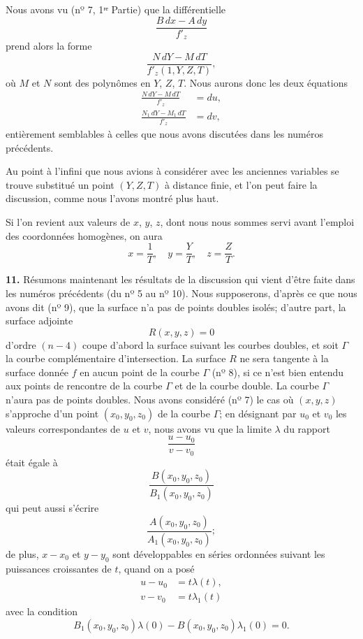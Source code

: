 \documentclass{article}
\begin{document}
Nous avons vu (nº 7, 1ʳᵉ Partie) que la différentielle
\[
\frac{B\,dx - A\,dy}{f'_{z}}
\]
prend alors la forme
\[
\frac{N\,dY - M\,dT}{f'_{z}(1, Y, Z, T)},
\]
où $M$ et $N$ sont des polynômes en $Y$, $Z$, $T$. Nous aurons donc les deux équations
\[
\begin{aligned}
\frac{N\,dY - M\,dT}{f'_{z}} &= du, \\
\frac{N_{1}\,dY - M_{1}\,dT}{f'_{z}} &= dv,
\end{aligned}
\]
entièrement semblables à celles que nous avons discutées dans les numéros précédents.

Au point à l'infini que nous avions à considérer avec les anciennes variables se trouve substitué un point $(Y, Z, T)$ à distance finie, et l'on peut faire la discussion, comme nous l'avons montré plus haut.

Si l'on revient aux valeurs de $x$, $y$, $z$, dont nous nous sommes servi avant l'emploi des coordonnées homogènes, on aura
\[
x = \frac{1}{T}, \quad y = \frac{Y}{T}, \quad z = \frac{Z}{T}.
\]

\textbf{11.} Résumons maintenant les résultats de la discussion qui vient d'être faite dans les numéros précédents (du nº 5 au nº 10). Nous supposerons, d'après ce que nous avons dit (nº 9), que la surface n'a pas de points doubles isolés; d'autre part, la surface adjointe
\[
R(x, y, z) = 0
\]
d'ordre $(n - 4)$ coupe d'abord la surface suivant les courbes doubles, et soit $\Gamma$ la courbe complémentaire d'intersection. La surface $R$ ne sera tangente à la surface donnée $f$ en aucun point de la courbe $\Gamma$ (nº 8), si ce n'est bien entendu aux points de rencontre de la courbe $\Gamma$ et de la courbe double. La courbe $\Gamma$ n'aura pas de points doubles. Nous avons considéré (nº 7) le cas où $(x, y, z)$ s'approche d'un point $(x_{0}, y_{0}, z_{0})$ de la courbe $\Gamma$; en désignant par $u_{0}$ et $v_{0}$ les valeurs correspondantes de $u$ et $v$, nous avons vu que la limite $\lambda$ du rapport
\[
\frac{u - u_{0}}{v - v_{0}}
\]
était égale à
\[
\frac{B(x_{0}, y_{0}, z_{0})}{B_{1}(x_{0}, y_{0}, z_{0})}
\]
qui peut aussi s'écrire
\[
\frac{A(x_{0}, y_{0}, z_{0})}{A_{1}(x_{0}, y_{0}, z_{0})};
\]
de plus, $x - x_{0}$ et $y - y_{0}$ sont développables en séries ordonnées suivant les puissances croissantes de $t$, quand on a posé
\[
\begin{aligned}
u - u_{0} &= t\lambda(t), \\
v - v_{0} &= t\lambda_{1}(t)
\end{aligned}
\]
avec la condition
\[
B_{1}(x_{0}, y_{0}, z_{0})\lambda(0) - B(x_{0}, y_{0}, z_{0})\lambda_{1}(0) = 0.
\]
\end{document}
